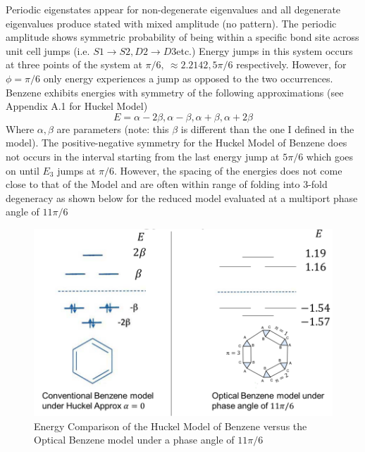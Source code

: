 Periodic eigenstates appear for non-degenerate eigenvalues and all degenerate eigenvalues produce stated with mixed amplitude (no pattern). \newline
The periodic amplitude shows symmetric probability of being within a specific bond site across unit cell jumps (i.e. $S1\rightarrow S2, D2\rightarrow D3$etc.)
Energy jumps in this system occurs at three points of the system at $\pi/6, ~\approx 2.2142, 5\pi/6$ respectively. However, for $\phi = \pi/6$ only energy experiences a jump as opposed to the two occurrences. \newline
Benzene exhibits energies with symmetry of the following approximations (see Appendix A.1 for Huckel Model)
\begin{equation}
    E = \alpha - 2\beta, \alpha - \beta, \alpha + \beta, \alpha + 2\beta
\end{equation}
Where $\alpha, \beta$ are parameters (note: this $\beta$ is different than the one I defined in the model). \newline
The positive-negative symmetry for the Huckel Model of Benzene does not occurs in the interval starting from the last energy jump at $5\pi/6$ which goes on until $E_{3}$ jumps at $\pi/6$. However, the spacing of the energies does not come close to that of the Model and are often within range of folding into 3-fold degeneracy as shown below for the reduced model evaluated at a multiport phase angle of $11\pi/6$
\begin{figure}[H]
    \centering
    \includegraphics[scale=0.7]{2_Body/energy_comparison.png}
    \caption{Energy Comparison of the Huckel Model of Benzene versus the Optical Benzene model under a phase angle of $11\pi/6$}
    \label{fig:my_label}
\end{figure}